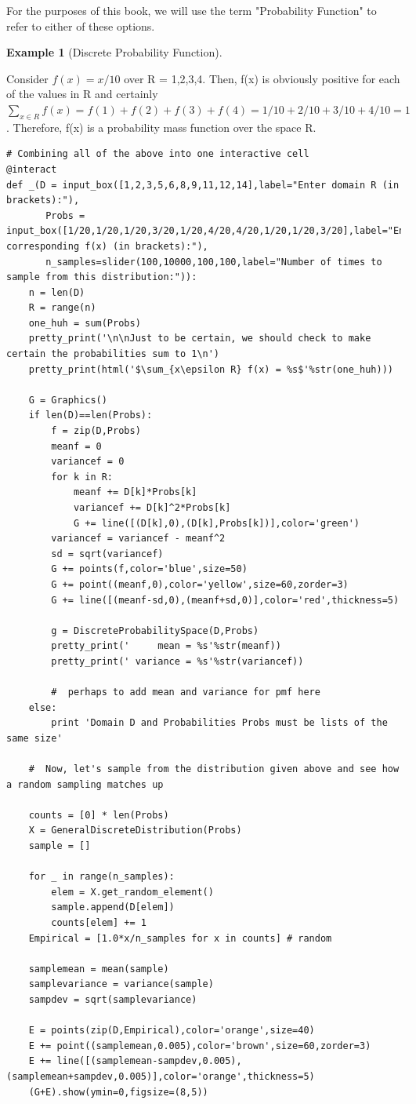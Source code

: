 \documentclass[10pt,]{book}
\theoremstyle{plain}
\theoremstyle{definition}
\theoremstyle{definition}
\newtheorem{example}[theorem]{Example}
\theoremstyle{definition}
\numberwithin{equation}{section}
\begin{document}
	For the purposes of this book, we will use the term "Probability Function" to refer to either of these options.
\begin{example}[Discrete Probability Function]\label{example-14}

	Consider \(f(x) = x/10\) over R = {1,2,3,4}.  Then, f(x) is obviously positive for each of the values in R and certainly \(\sum_{x \in R} f(x) = f(1) + f(2) + f(3) + f(4) = 1/10 + 2/10 + 3/10 + 4/10 = 1\). Therefore, f(x) is a probability mass function over the space R.
\end{example}
\begin{lstlisting}[style=sageinput]
# Combining all of the above into one interactive cell
@interact
def _(D = input_box([1,2,3,5,6,8,9,11,12,14],label="Enter domain R (in brackets):"), 
       Probs = input_box([1/20,1/20,1/20,3/20,1/20,4/20,4/20,1/20,1/20,3/20],label="Enter corresponding f(x) (in brackets):"),
       n_samples=slider(100,10000,100,100,label="Number of times to sample from this distribution:")):
    n = len(D)
    R = range(n)
    one_huh = sum(Probs)
    pretty_print('\n\nJust to be certain, we should check to make certain the probabilities sum to 1\n')
    pretty_print(html('$\sum_{x\epsilon R} f(x) = %s$'%str(one_huh)))
    
    G = Graphics()
    if len(D)==len(Probs):
        f = zip(D,Probs)
        meanf = 0
        variancef = 0
        for k in R:
            meanf += D[k]*Probs[k]
            variancef += D[k]^2*Probs[k]
            G += line([(D[k],0),(D[k],Probs[k])],color='green')
        variancef = variancef - meanf^2
        sd = sqrt(variancef)
        G += points(f,color='blue',size=50)
        G += point((meanf,0),color='yellow',size=60,zorder=3)
        G += line([(meanf-sd,0),(meanf+sd,0)],color='red',thickness=5)
    
        g = DiscreteProbabilitySpace(D,Probs)
        pretty_print('     mean = %s'%str(meanf))
        pretty_print(' variance = %s'%str(variancef))
    
        #  perhaps to add mean and variance for pmf here
    else:
        print 'Domain D and Probabilities Probs must be lists of the same size'
    
    #  Now, let's sample from the distribution given above and see how a random sampling matches up

    counts = [0] * len(Probs)
    X = GeneralDiscreteDistribution(Probs)
    sample = []

    for _ in range(n_samples):
        elem = X.get_random_element()
        sample.append(D[elem])
        counts[elem] += 1
    Empirical = [1.0*x/n_samples for x in counts] # random
    
    samplemean = mean(sample)
    samplevariance = variance(sample)
    sampdev = sqrt(samplevariance)
    
    E = points(zip(D,Empirical),color='orange',size=40)
    E += point((samplemean,0.005),color='brown',size=60,zorder=3)
    E += line([(samplemean-sampdev,0.005),(samplemean+sampdev,0.005)],color='orange',thickness=5)    
    (G+E).show(ymin=0,figsize=(8,5))
\end{lstlisting}
\end{document}
